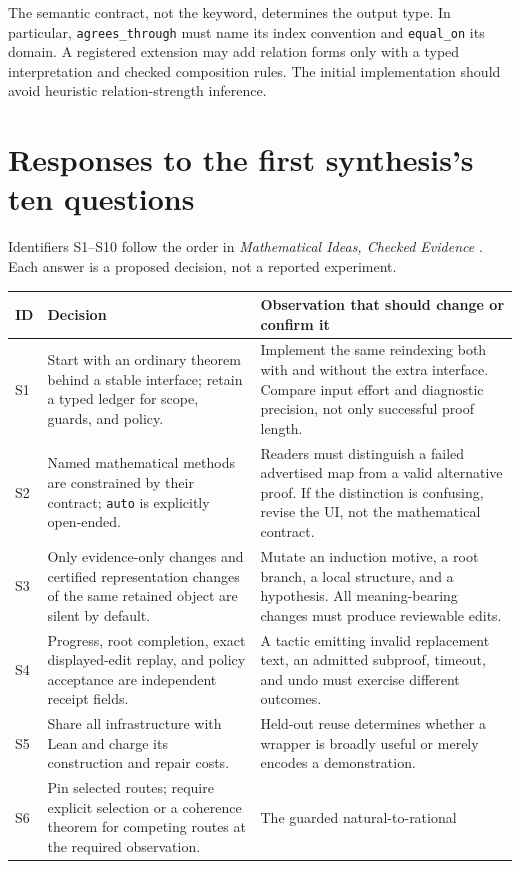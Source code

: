 \documentclass[11pt,letterpaper]{article}
\newcommand{\code}[1]{\nolinkurl{#1}}
\numberwithin{equation}{section}
\begin{document}
The semantic contract, not the keyword, determines the output type. In
particular, \code{agrees_through} must name its index convention and
\code{equal_on} its domain. A registered extension may add relation forms only
with a typed interpretation and checked composition rules. The initial
implementation should avoid heuristic relation-strength inference.

\section{Responses to the first synthesis's ten questions}\label{app:questions}
Identifiers S1--S10 follow the order in \emph{Mathematical Ideas, Checked Evidence}
\cite{synthesis}. Each answer is a proposed decision, not a reported experiment.

\begin{longtable}{@{}P{.07\textwidth}P{.39\textwidth}P{.46\textwidth}@{}}
\toprule
ID & Decision & Observation that should change or confirm it\\
\midrule
\endhead
S1 & Start with an ordinary theorem behind a stable interface; retain a typed
ledger for scope, guards, and policy. & Implement the same reindexing both with
and without the extra interface. Compare input effort and diagnostic precision,
not only successful proof length.\\
S2 & Named mathematical methods are constrained by their contract; \code{auto}
is explicitly open-ended. & Readers must distinguish a failed advertised map
from a valid alternative proof. If the distinction is confusing, revise the UI,
not the mathematical contract.\\
S3 & Only evidence-only changes and certified representation changes of the same
retained object are silent by default. & Mutate an induction motive, a root
branch, a local structure, and a hypothesis. All meaning-bearing changes must
produce reviewable edits.\\
S4 & Progress, root completion, exact displayed-edit replay, and policy acceptance
are independent receipt fields. & A tactic emitting invalid replacement text,
an admitted subproof, timeout, and undo must exercise different outcomes.\\
S5 & Share all infrastructure with Lean and charge its construction and repair
costs. & Held-out reuse determines whether a wrapper is broadly useful or merely
encodes a demonstration.\\
S6 & Pin selected routes; require explicit selection or a coherence theorem for
competing routes at the required observation. & The guarded natural-to-rational

\end{longtable}
\end{document}
